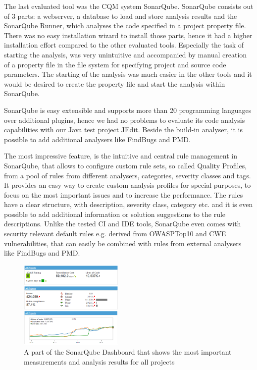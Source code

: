 \documentclass[conference]{IEEEtran}
\begin{document}
The last evaluated tool was the CQM system SonarQube.
SonarQube consists out of 3 parts: a webserver, a database to load and store analysis results and the SonarQube Runner, which analyses the code specified in a project property file.
There was no easy installation wizard to install those parts, hence it had a higher installation effort compared to the other evaluated tools.
Especially the task of starting the analysis, was very unintuitive and accompanied by manual creation of a property file in the file system for specifying project and source code parameters.
The starting of the analysis was much easier in the other tools and it would be desired to create the property file and start the analysis within SonarQube.


SonarQube is easy extensible and supports more than 20 programming languages over additional plugins, hence we had no problems to evaluate its code analysis capabilities with our Java test project JEdit.
Beside the build-in analyser, it is possible to add additional analysers like FindBugs and PMD.


The most impressive feature, is the intuitive and central rule management in SonarQube, that allows to configure custom rule sets, so called Quality Profiles, from a pool of rules from different analysers, categories, severity classes and tags.
It provides an easy way to create custom analysis profiles for special purposes, to focus on the most important issues and to increase the performance.
The rules have a clear structure, with description, severity class, category etc. and it is even possible to add additional information or solution suggestions to the rule descriptions.
Unlike the tested CI and IDE tools, SonarQube even comes with security relevant default rules e.g. derived from OWASPTop10 and CWE vulnerabilities, that can easily be combined with rules from external analysers like FindBugs and PMD.


\begin{figure}[t]
	\centering
	\includegraphics[width=0.45\textwidth]{img/Sonarqube.png}
	\caption{A part of the SonarQube Dashboard that shows the most important measurements and analysis results for all projects}
	\label{fig:sonarqube-dashboard}
\end{figure}
\end{document}
